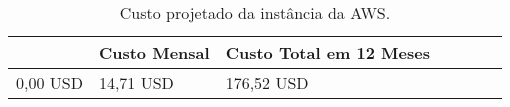 \begin{table}[]

    \caption{Custo projetado da instância da AWS.}
    \label{Tb:tab_escolhas_instancia}
    \centering
    
    \begin{adjustbox}{width=\textwidth}
        \begin{tabular}{ccc p{6cm} ccc}
            \rowcolor[HTML]{C0C0C0} 

            \hline
            
            \multicolumn{1}{|l|}{\textbf{Custo inicial}}  & \multicolumn{1}{|l|}{\textbf{Custo Mensal}}  & \multicolumn{1}{|l|}{\textbf{Custo Total em 12 Meses}} \\

            \hline
            
            \multicolumn{1}{|l|}{0,00 USD}  & \multicolumn{1}{|l|}{14,71 USD}    & \multicolumn{1}{|l|}{176,52 USD}  \\

            \hline
        \end{tabular}
    \end{adjustbox}
\end{table}


